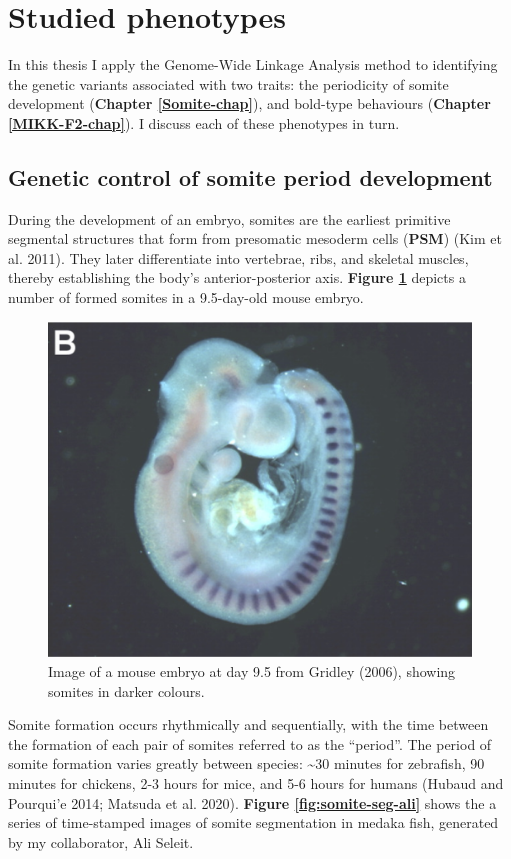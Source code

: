 \documentclass[
]{book}
\begin{document}
\hypertarget{studied-phenotypes}{%
\section{Studied phenotypes}\label{studied-phenotypes}}

In this thesis I apply the Genome-Wide Linkage Analysis method to identifying the genetic variants associated with two traits: the periodicity of somite development (\textbf{Chapter \ref{Somite-chap}}), and bold-type behaviours (\textbf{Chapter \ref{MIKK-F2-chap}}). I discuss each of these phenotypes in turn.

\hypertarget{genetic-control-of-somite-period-development}{%
\subsection{Genetic control of somite period development}\label{genetic-control-of-somite-period-development}}

During the development of an embryo, somites are the earliest primitive segmental structures that form from presomatic mesoderm cells (\textbf{PSM}) (Kim et al. 2011). They later differentiate into vertebrae, ribs, and skeletal muscles, thereby establishing the body's anterior-posterior axis. \textbf{Figure \ref{fig:mouse-embryo}} depicts a number of formed somites in a 9.5-day-old mouse embryo.


\begin{figure}

{\centering \includegraphics[width=0.6\linewidth]{figs/somites/mouse_embryo_gridley} 

}

\caption{Image of a mouse embryo at day 9.5 from Gridley (2006), showing somites in darker colours.}\label{fig:mouse-embryo}
\end{figure}

Somite formation occurs rhythmically and sequentially, with the time between the formation of each pair of somites referred to as the ``period''. The period of somite formation varies greatly between species: \textasciitilde30 minutes for zebrafish, 90 minutes for chickens, 2-3 hours for mice, and 5-6 hours for humans (Hubaud and Pourqui'e 2014; Matsuda et al. 2020). \textbf{Figure \ref{fig:somite-seg-ali}} shows the a series of time-stamped images of somite segmentation in medaka fish, generated by my collaborator, Ali Seleit.
\end{document}
